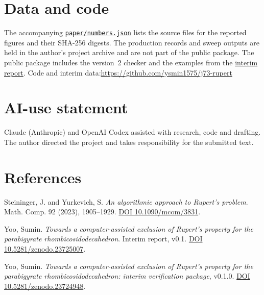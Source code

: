 \documentclass[11pt,a4paper]{amsart}
\newcommand{\interimpaper}{\href{https://doi.org/10.5281/zenodo.23725007}{interim report}}
\newcommand{\numbersledger}{\href{https://github.com/ysmin1575/j73-rupert/blob/v0.2.0/paper/numbers.json}{\texttt{paper/numbers.json}}}
\begin{document}
\section*{Data and code}

The accompanying \numbersledger{} lists the source files for the
reported figures and their SHA-256 digests. The production records and
sweep outputs are held in the author's project archive and are not part
of the public package. The public package includes the version~2
checker and the examples from the \interimpaper.
Code and interim data:\newline \url{https://github.com/ysmin1575/j73-rupert}

\section*{AI-use statement}

Claude (Anthropic) and OpenAI Codex assisted with research, code and
drafting. The author directed the project and takes responsibility for
the submitted text.

\section*{References}

Steininger, J. and Yurkevich, S. \emph{An algorithmic approach to
Rupert's problem}. Math. Comp. 92 (2023), 1905--1929.
\href{https://doi.org/10.1090/mcom/3831}{DOI 10.1090/mcom/3831}.

Yoo, Sumin. \emph{Towards a computer-assisted exclusion of Rupert's
property for the parabigyrate rhombicosidodecahedron}.
Interim report, v0.1. \href{https://doi.org/10.5281/zenodo.23725007}{DOI 10.5281/zenodo.23725007}.

Yoo, Sumin. \emph{Towards a computer-assisted exclusion of Rupert's
property for the parabigyrate rhombicosidodecahedron: interim
verification package}, v0.1.0.
\href{https://doi.org/10.5281/zenodo.23724948}{DOI 10.5281/zenodo.23724948}.
\end{document}
